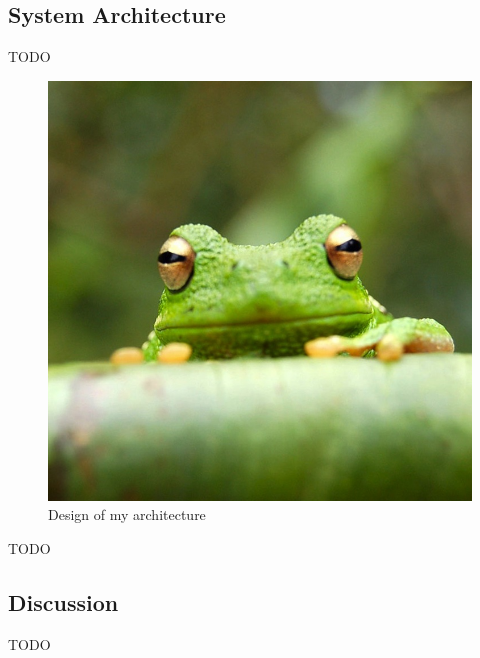 \documentclass{article}
\begin{document}
\subsection{System Architecture}
TODO
\begin{figure}[h]
\includegraphics[width=\textwidth]{frog.jpg}
\caption{Design of my architecture}
\end{figure}
TODO

\subsection{Discussion}
TODO

\printbibliography[heading=bibintoc]
\end{document}
